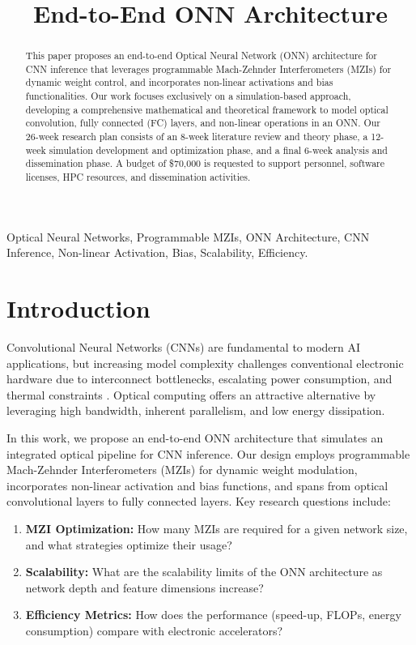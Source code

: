 \documentclass[conference]{IEEEtran}
\title{\textbf{End-to-End ONN Architecture}}
\author{
  \IEEEauthorblockN{Santiago Sosa, Marc DeCarlo}
  \IEEEauthorblockA{Department of Electrical and Computer Engineering\\ 
  Drexel University\\
  Emails: \{ss5427, mad534\}@drexel.edu}
}
\begin{document}
\maketitle

\begin{abstract}
This paper proposes an end-to-end Optical Neural Network (ONN) architecture for CNN inference that leverages programmable Mach-Zehnder Interferometers (MZIs) for dynamic weight control, and incorporates non-linear activations and bias functionalities. Our work focuses exclusively on a simulation-based approach, developing a comprehensive mathematical and theoretical framework to model optical convolution, fully connected (FC) layers, and non-linear operations in an ONN. Our 26-week research plan consists of an 8-week literature review and theory phase, a 12-week simulation development and optimization phase, and a final 6-week analysis and dissemination phase. A budget of \$70,000 is requested to support personnel, software licenses, HPC resources, and dissemination activities.
\end{abstract}

\begin{IEEEkeywords}
Optical Neural Networks, Programmable MZIs, ONN Architecture, CNN Inference, Non-linear Activation, Bias, Scalability, Efficiency.
\end{IEEEkeywords}

\section{Introduction}
Convolutional Neural Networks (CNNs) are fundamental to modern AI applications, but increasing model complexity challenges conventional electronic hardware due to interconnect bottlenecks, escalating power consumption, and thermal constraints \cite{ref:jouppi2017datacenter}. Optical computing offers an attractive alternative by leveraging high bandwidth, inherent parallelism, and low energy dissipation. 

In this work, we propose an end-to-end ONN architecture that simulates an integrated optical pipeline for CNN inference. Our design employs programmable Mach-Zehnder Interferometers (MZIs) for dynamic weight modulation, incorporates non-linear activation and bias functions, and spans from optical convolutional layers to fully connected layers. Key research questions include:
\begin{enumerate}
    \item \textbf{MZI Optimization:} How many MZIs are required for a given network size, and what strategies optimize their usage?
    \item \textbf{Scalability:} What are the scalability limits of the ONN architecture as network depth and feature dimensions increase?
    \item \textbf{Efficiency Metrics:} How does the performance (speed-up, FLOPs, energy consumption) compare with electronic accelerators?
\end{enumerate}
\end{document}
